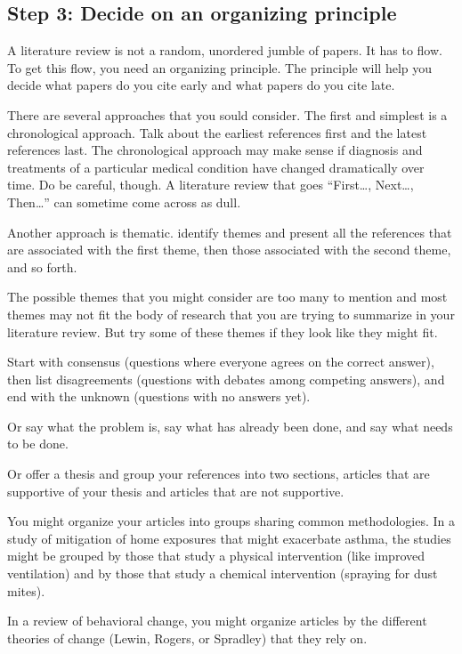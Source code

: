 \documentclass[
  letterpaper,
  DIV=11,
  numbers=noendperiod]{scrreprt}
\begin{document}
\begin{tcolorbox}
\section{Step 3: Decide on an organizing
principle}\label{step-3-decide-on-an-organizing-principle}

A literature review is not a random, unordered jumble of papers. It has
to flow. To get this flow, you need an organizing principle. The
principle will help you decide what papers do you cite early and what
papers do you cite late.

There are several approaches that you sould consider. The first and
simplest is a chronological approach. Talk about the earliest references
first and the latest references last. The chronological approach may
make sense if diagnosis and treatments of a particular medical condition
have changed dramatically over time. Do be careful, though. A literature
review that goes ``First\ldots, Next\ldots, Then\ldots{}'' can sometime
come across as dull.

Another approach is thematic. identify themes and present all the
references that are associated with the first theme, then those
associated with the second theme, and so forth.

The possible themes that you might consider are too many to mention and
most themes may not fit the body of research that you are trying to
summarize in your literature review. But try some of these themes if
they look like they might fit.

Start with consensus (questions where everyone agrees on the correct
answer), then list disagreements (questions with debates among competing
answers), and end with the unknown (questions with no answers yet).

Or say what the problem is, say what has already been done, and say what
needs to be done.

Or offer a thesis and group your references into two sections, articles
that are supportive of your thesis and articles that are not supportive.

You might organize your articles into groups sharing common
methodologies. In a study of mitigation of home exposures that might
exacerbate asthma, the studies might be grouped by those that study a
physical intervention (like improved ventilation) and by those that
study a chemical intervention (spraying for dust mites).

In a review of behavioral change, you might organize articles by the
different theories of change (Lewin, Rogers, or Spradley) that they rely
on.


\end{tcolorbox}
\end{document}
